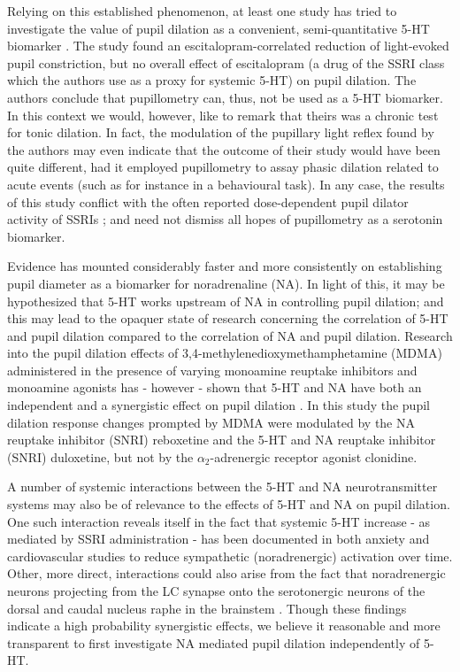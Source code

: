 	Relying on this established phenomenon, at least one study has tried to investigate the value of pupil dilation as a convenient, semi-quantitative 5-HT biomarker \citep{Noehr-Jensen2009}.
	The study found an escitalopram-correlated reduction of light-evoked pupil constriction, but no overall effect of escitalopram (a drug of the SSRI class which the authors use as a proxy for systemic 5-HT) on pupil dilation.
	The authors conclude that pupillometry can, thus, not be used as a 5-HT biomarker.
	In this context we would, however, like to remark that theirs was a chronic test for tonic dilation.
	In fact, the modulation of the pupillary light reflex found by the authors may even indicate that the outcome of their study would have been quite different, had it employed pupillometry to assay phasic dilation related to acute events (such as for instance in a behavioural task).
	In any case, the results of this study conflict with the often reported dose-dependent pupil dilator activity of SSRIs \citep{Nielsen2010,Fitzgerald2013,Klein-Schwartz2012};
	and need not dismiss all hopes of pupillometry as a serotonin biomarker.
	
	Evidence has mounted considerably faster and more consistently on establishing pupil diameter as a biomarker for noradrenaline (NA).
	In light of this, it may be hypothesized that 5-HT works upstream of NA in controlling pupil dilation; and this may lead to the opaquer state of research concerning the correlation of 5-HT and pupil dilation compared to the correlation of NA and pupil dilation.
	Research into the pupil dilation effects of 3,4-methylenedioxymethamphetamine (MDMA) administered in the presence of varying monoamine reuptake inhibitors and monoamine agonists has - however - shown that 5-HT and NA have both an independent and a synergistic effect on pupil dilation \citep{Hysek2012}.
	In this study the pupil dilation response changes prompted by MDMA were modulated by the NA reuptake inhibitor (SNRI) reboxetine and the 5-HT and NA reuptake inhibitor (SNRI) duloxetine, but not by the $\alpha_2$-adrenergic receptor agonist clonidine.
	
	A number of systemic interactions between the 5-HT and NA neurotransmitter systems may also be of relevance to the effects of 5-HT and NA on pupil dilation.
	One such interaction reveals itself in the fact that systemic 5-HT increase - as mediated by SSRI administration - has been documented in both anxiety \citep{Blier2007} and cardiovascular \citep{Barton2007} studies to reduce sympathetic (noradrenergic) activation over time.
	Other, more direct, interactions could also arise from the fact that noradrenergic neurons projecting from the LC synapse onto the serotonergic neurons of the dorsal and caudal nucleus raphe in the brainstem \citep{Samuels2008}.
	Though these findings indicate a high probability synergistic effects, we believe it reasonable and more transparent to first investigate NA mediated pupil dilation independently of 5-HT.
	
